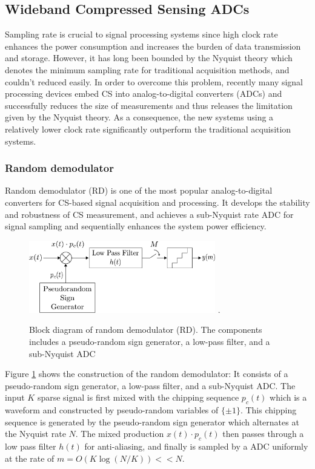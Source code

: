 \subsection{Wideband Compressed Sensing ADCs}\label{sct:wideband_cs_adc}
Sampling rate is crucial to signal processing systems since high clock rate enhances the power consumption and increases the burden of data transmission and storage. However, it has long been bounded by the Nyquist theory which denotes the minimum sampling rate for traditional acquisition methods, and couldn't reduced easily. In order to overcome this problem, recently many signal processing devices embed CS into analog-to-digital converters (ADCs) and successfully reduces the size of measurements and thus releases the limitation given by the Nyquist theory. As a consequence, the new systems using a relatively lower clock rate significantly outperform the traditional acquisition systems.   

\subsubsection{Random demodulator}
Random demodulator (RD)\cite{tropp2010beyond} is one of the most popular analog-to-digital converters for CS-based signal acquisition and processing. It develops the stability and robustness of CS measurement, and achieves a sub-Nyquist rate ADC for signal sampling and sequentially enhances the system power efficiency.  

\begin{figure}[!b]
\centering
\includegraphics[width=3.2in]{pictures/random_demodulator.pdf}
\DeclareGraphicsExtensions.
\caption{Block diagram of random demodulator (RD). The components includes a pseudo-random sign generator, a low-pass filter, and a sub-Nyquist ADC}\label{RD}
\end{figure}

Figure \ref{RD} shows the construction of the random demodulator: It consists of a pseudo-random sign generator, a low-pass filter, and a sub-Nyquist ADC. The input $K$ sparse signal is first mixed with the chipping sequence $p_c(t)$ which is a waveform and constructed by pseudo-random variables of $\{\pm 1\}$. This chipping sequence is generated by the pseudo-random sign generator which alternates at the Nyquist rate $N$. The mixed production $x(t) \cdot p_c(t)$ then passes through a low pass filter $h(t)$ for anti-aliasing, and finally is sampled by a ADC uniformly at the rate of $m = O(K\log(N/K)) << N$. %

